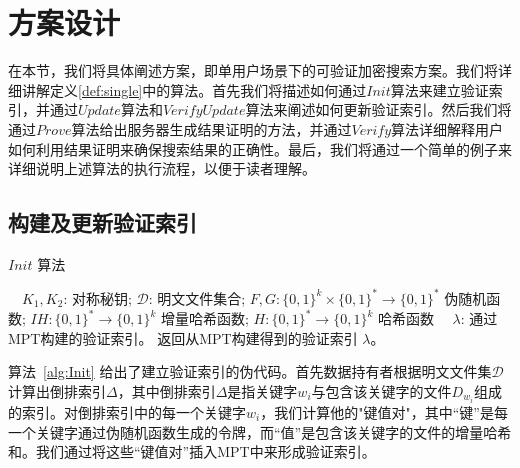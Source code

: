 \section{方案设计}
在本节，我们将具体阐述\single 方案，即单用户场景下的可验证加密搜索方案。我们将详细讲解定义\ref{def:single}中的算法。首先我们将描述如何通过$Init$算法来建立验证索引，并通过$Update$算法和$VerifyUpdate$算法来阐述如何更新验证索引。然后我们将通过$Prove$算法给出服务器生成结果证明的方法，并通过$Verify$算法详细解释用户如何利用结果证明来确保搜索结果的正确性。最后，我们将通过一个简单的例子来详细说明上述算法的执行流程，以便于读者理解。

\subsection{构建及更新验证索引}
\begin{algorithm}[ht]
  \caption{$Init$ 算法}
  \label{alg:Init}
  \begin{algorithmic}[1]
    \REQUIRE ~~{$K_1,K_2$: 对称秘钥; $\mathcal{D}$: 明文文件集合;  $F, G: \{0, 1\}^k \times \{0, 1\}^* \rightarrow \{0, 1\}^*$ 伪随机函数; $IH: \{0, 1\}^* \rightarrow \{0, 1\}^k$ 增量哈希函数; $H: \{0, 1\}^* \rightarrow \{0, 1\}^k$ 哈希函数}
    \ENSURE ~~{$\lambda$: 通过MPT构建的验证索引。}
              \ENDFOR
              \RETURN 返回从MPT构建得到的验证索引 $\lambda$。
  \end{algorithmic}
\end{algorithm}

算法~\ref{alg:Init} 给出了建立验证索引的伪代码。首先数据持有者根据明文文件集$\mathcal{D}$计算出倒排索引$\Delta$，其中倒排索引$\Delta$是指关键字$w_i$与包含该关键字的文件$D_{w_i}$组成的索引。对倒排索引中的每一个关键字$w_i$，我们计算他的"键值对"，其中“键”是每一个关键字通过伪随机函数生成的令牌，而“值”是包含该关键字的文件的增量哈希和。我们通过将这些“键值对”插入MPT中来形成验证索引。

